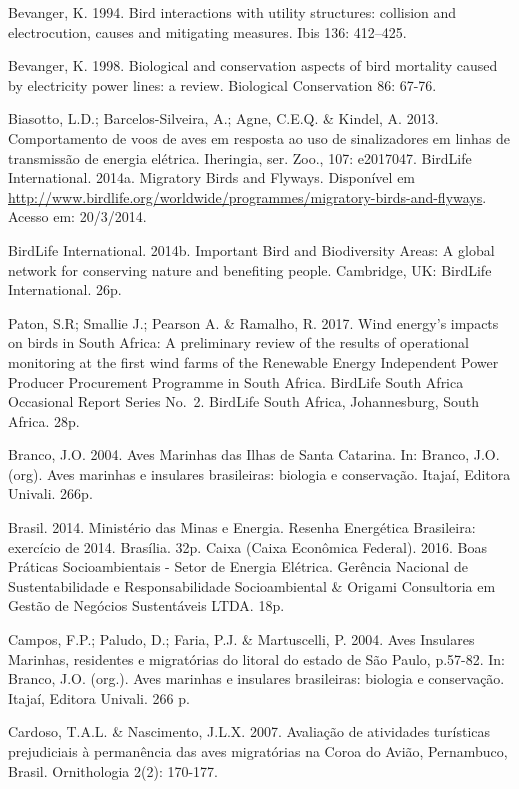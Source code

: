 \documentclass[
  oneside]{scrbook}
\begin{document}
Bevanger, K. 1994. Bird interactions with utility structures: collision and electrocution, causes and mitigating measures. Ibis 136: 412--425.

Bevanger, K. 1998. Biological and conservation aspects of bird mortality caused by electricity power lines: a review. Biological Conservation 86: 67-76.

Biasotto, L.D.; Barcelos-Silveira, A.; Agne, C.E.Q. \& Kindel, A. 2013. Comportamento de voos de aves em resposta ao uso de sinalizadores em linhas de transmissão de energia elétrica. Iheringia, ser. Zoo., 107: e2017047.
BirdLife International. 2014a. Migratory Birds and Flyways. Disponível em \url{http://www.birdlife.org/worldwide/programmes/migratory-birds-and-flyways}. Acesso em: 20/3/2014.

BirdLife International. 2014b. Important Bird and Biodiversity Areas: A global network for conserving nature and benefiting people. Cambridge, UK: BirdLife International. 26p.

Paton, S.R; Smallie J.; Pearson A. \& Ramalho, R. 2017. Wind energy's impacts on birds in South Africa: A preliminary review of the results of operational monitoring at the first wind farms of the Renewable Energy Independent Power Producer Procurement Programme in South Africa. BirdLife South Africa Occasional Report Series No.~2. BirdLife South Africa, Johannesburg, South Africa. 28p.

Branco, J.O. 2004. Aves Marinhas das Ilhas de Santa Catarina. In: Branco, J.O. (org). Aves marinhas e insulares brasileiras: biologia e conservação. Itajaí, Editora Univali. 266p.

Brasil. 2014. Ministério das Minas e Energia. Resenha Energética Brasileira: exercício de 2014. Brasília. 32p.
Caixa (Caixa Econômica Federal). 2016. Boas Práticas Socioambientais - Setor de Energia Elétrica. Gerência Nacional de Sustentabilidade e Responsabilidade Socioambiental \& Origami Consultoria em Gestão de Negócios Sustentáveis LTDA. 18p.

Campos, F.P.; Paludo, D.; Faria, P.J. \& Martuscelli, P. 2004. Aves Insulares Marinhas, residentes e migratórias do litoral do estado de São Paulo, p.57-82. In: Branco, J.O. (org.). Aves marinhas e insulares brasileiras: biologia e conservação. Itajaí, Editora Univali. 266 p.~

Cardoso, T.A.L. \& Nascimento, J.L.X. 2007. Avaliação de atividades turísticas prejudiciais à permanência das aves migratórias na Coroa do Avião, Pernambuco, Brasil. Ornithologia 2(2): 170-177.
\end{document}
